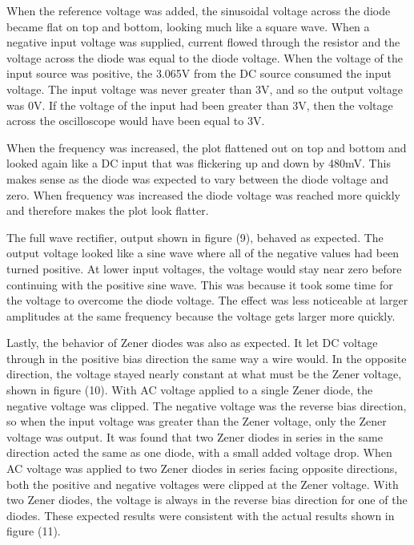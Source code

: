 \documentclass[twocolumn, amsmath]{revtex4}
\begin{document}
When the reference voltage was added, the sinusoidal voltage across the diode became flat on top and bottom, looking much like a square wave. When a negative input voltage was supplied, current flowed through the resistor and the voltage across the diode %
 was equal to the diode voltage. When the voltage of the input source was positive, the 3.065V from the DC source consumed the input voltage. The input voltage was never greater than 3V, and so the output voltage was 0V. If the voltage of the input had been greater than 3V, then the voltage across the oscilloscope would have been equal to 3V.

When the frequency was increased, the plot flattened out on top and bottom and looked again like a DC input that was flickering up and down by 480mV. This makes sense as the diode was expected to vary between the diode voltage and zero. When frequency was increased the diode voltage was reached more quickly and therefore makes the plot look flatter.

The full wave rectifier, output shown in figure (9), behaved as expected. The output voltage looked like a sine wave where all of the negative values had been turned positive. At lower input voltages, the voltage would stay near zero before continuing with the positive sine wave. This was because it took some time for the voltage to overcome the diode voltage. The effect was less noticeable at larger amplitudes at the same frequency because the voltage gets larger more quickly.

Lastly, the behavior of Zener diodes was also as expected. It let DC voltage through in the positive bias direction the same way a wire would. In the opposite direction, the voltage stayed nearly constant at what must be the Zener voltage, shown in figure (10). With AC voltage applied to a single Zener diode, the negative voltage was clipped. The negative voltage was the reverse bias direction, so when the input voltage was greater than the Zener voltage, only the Zener voltage was output. It was found that two Zener diodes in series in the same direction acted the same as one diode, with a small added voltage drop. When AC voltage was applied to two Zener diodes in series facing opposite directions, both the positive and negative voltages were clipped at the Zener voltage. With two Zener diodes, the voltage is always in the reverse bias direction for one of the diodes. These expected results were consistent with the actual results shown in figure (11).
\end{document}
